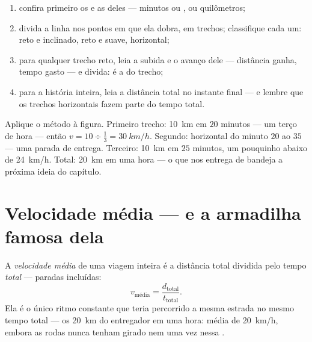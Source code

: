 \begin{method}\label{met:g7:motion-average-speed:read}
\begin{enumerate}
  \item confira primeiro os  e as  deles --- minutos ou
        ,  ou quilômetros;
  \item divida a linha nos pontos em que ela dobra, em trechos;
        classifique cada um: reto e inclinado, reto e suave,
        horizontal;
  \item para qualquer trecho reto, leia a subida e o avanço dele ---
        distância ganha, tempo gasto --- e divida: é a  do
        trecho;
  \item para a história inteira, leia a distância total no instante
        final --- e lembre que os trechos horizontais fazem parte do
        tempo total.
\end{enumerate}
\end{method}

\begin{example}\label{ex:g7:motion-average-speed:decoded}
Aplique o método à figura. Primeiro trecho: \qty{10}{km} em $20$
minutos --- um terço de hora --- então
$v = 10 \div \tfrac{1}{3} = \qty{30}{km/h}$. Segundo: horizontal do
minuto $20$ ao $35$ --- uma parada de entrega. Terceiro:
\qty{10}{km} em $25$ minutos, um pouquinho abaixo de \qty{24}{km/h}.
Total: \qty{20}{km} em uma hora --- o que nos entrega de bandeja a
próxima ideia do capítulo.
\end{example}

\section{Velocidade média --- e a armadilha famosa dela}

\begin{definition}\label{def:g7:motion-average-speed:average}
A \emph{velocidade média} de uma viagem
inteira é a distância total dividida pelo tempo \emph{total} ---
paradas incluídas:
\[
v_{\text{média}} = \frac{d_{\text{total}}}{t_{\text{total}}}.
\]
Ela é o único ritmo constante que teria percorrido a mesma estrada no
mesmo tempo total --- os \qty{20}{km} do entregador em uma hora:
média de \qty{20}{km/h}, embora as rodas nunca tenham girado nem uma
vez nessa .
\end{definition}

